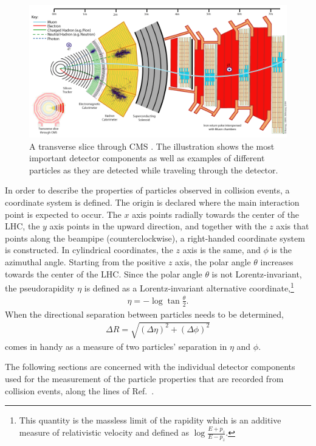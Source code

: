 \begin{figure}
	\includegraphics[width=\textwidth]{Detector/CMS_Slice}
	\centering
	\caption{A transverse slice through CMS \cite{CMS_Slice}. The illustration shows the most important detector components as well as examples of different particles as they are detected while traveling through the detector.}
	\label{fig:CMS}
\end{figure}

In order to describe the properties of particles observed in collision events, a coordinate system is defined. The origin is declared where the main interaction point is expected to occur. The $x$ axis points radially towards the center of the LHC, the $y$ axis points in the upward direction, and together with the $z$ axis that points along the beampipe (counterclockwise), a right-handed coordinate system is constructed. In cylindrical coordinates, the $z$ axis is the same, and $\phi$ is the azimuthal angle. Starting from the positive $z$ axis, the polar angle $\theta$ increases towards the center of the LHC. Since the polar angle $\theta$ is not Lorentz-invariant, the pseudorapidity $\eta$ is defined as a Lorentz-invariant alternative coordinate,\footnote{This quantity is the massless limit of the rapidity which is an additive measure of relativistic velocity and defined as $\log \frac{E + p_z}{E - p_z}$.}
\begin{eqnarray}
	\eta = - \log \tan \frac{\theta}{2}.
\end{eqnarray}
When the directional separation between particles needs to be determined,
\begin{eqnarray}
	\Delta R = \sqrt{(\Delta \eta)^2 + (\Delta \phi)^2}
\end{eqnarray}
comes in handy as a measure of two particles' separation in $\eta$ and $\phi$.

The following sections are concerned with the individual detector components used for the measurement of the particle properties that are recorded from collision events, along the lines of Ref.~\cite{Xie:1455454}.

